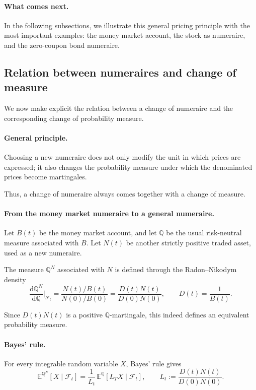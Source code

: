 \documentclass[11pt]{article}
\newcommand{\Qbb}{\mathbb{Q}}
\newcommand{\E}{\mathbb{E}}
\theoremstyle{definition}
\theoremstyle{plain}
\begin{document}
\paragraph{What comes next.}
In the following subsections, we illustrate this general pricing
principle with the most important examples:
the money market account, the stock as numeraire, and the zero-coupon
bond numeraire.

\subsection{Relation between numeraires and change of measure}

We now make explicit the relation between a change of numeraire and the
corresponding change of probability measure.

\paragraph{General principle.}
Choosing a new numeraire does not only modify the unit in which prices
are expressed; it also changes the probability measure under which the
denominated prices become martingales.

Thus, a change of numeraire always comes together with a change of
measure.

\paragraph{From the money market numeraire to a general numeraire.}
Let \(B(t)\) be the money market account, and let \(\Qbb\) be the usual
risk-neutral measure associated with \(B\).
Let \(N(t)\) be another strictly positive traded asset, used as a new
numeraire.

The measure \(\Qbb^N\) associated with \(N\) is defined through the
Radon--Nikodym density
\[
\frac{\mathrm{d}\Qbb^N}{\mathrm{d}\Qbb}\Big|_{\mathcal{F}_t}
=
\frac{N(t)/B(t)}{N(0)/B(0)}
=
\frac{D(t)N(t)}{D(0)N(0)},
\qquad D(t)=\frac1{B(t)}.
\]

Since \(D(t)N(t)\) is a positive \(\Qbb\)-martingale, this indeed defines
an equivalent probability measure.

\paragraph{Bayes' rule.}
For every integrable random variable \(X\), Bayes' rule gives
\[
\E^{\Qbb^N}[X\mid\mathcal{F}_t]
=
\frac{1}{L_t}\,
\E^\Qbb[L_T X\mid\mathcal{F}_t],
\qquad
L_t:=\frac{D(t)N(t)}{D(0)N(0)}.
\]
\end{document}
